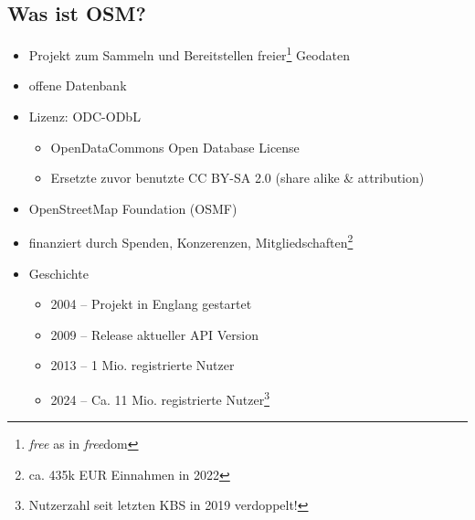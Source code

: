 \documentclass{beamer}
\begin{document}
		\subsection{Was ist OSM?}
	
			\begin{frame}
				\begin{itemize}
					\item Projekt zum Sammeln und Bereitstellen freier\footnote{\textit{free} as in \textit{free}dom} Geodaten
					\item offene Datenbank
					\item Lizenz: ODC-ODbL
					\begin{itemize}
						\item OpenDataCommons Open Database License
						\item Ersetzte zuvor benutzte CC BY-SA 2.0 {\tiny (share alike \& attribution)}
					\end{itemize}\pause
					\item OpenStreetMap Foundation (OSMF)
					\item finanziert durch Spenden, Konzerenzen, Mitgliedschaften\footnote{ca. 435k EUR Einnahmen in 2022}\pause
					\item Geschichte
					\begin{itemize}
						\item 2004 -- Projekt in Englang gestartet
						\item 2009 -- Release aktueller API Version
						\item 2013 -- 1 Mio. registrierte Nutzer
						\item 2024 -- Ca. 11 Mio. registrierte Nutzer\footnote{Nutzerzahl seit letzten KBS in 2019 verdoppelt!}
					\end{itemize}
				\end{itemize}
			\end{frame}
\end{document}
